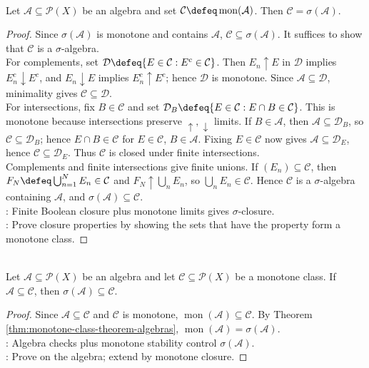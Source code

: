 \begin{theorem} \label{thm:monotone-class-theorem-algebras} \\
Let $\mathcal{A}\subseteq\mathcal{P}(X)$ be an algebra and set $\mathcal{C}\defeq\operatorname{mon}(\mathcal{A})$. Then $\mathcal{C}=\sigma(\mathcal{A})$.
\begin{proof} Since $\sigma(\mathcal{A})$ is monotone and contains $\mathcal{A}$, $\mathcal{C}\subseteq\sigma(\mathcal{A})$. It suffices to show that $\mathcal{C}$ is a $\sigma$-algebra.\\
For complements, set $\mathcal{D}\defeq\{E\in\mathcal{C}:E^c\in\mathcal{C}\}$. Then $E_n\uparrow E$ in $\mathcal{D}$ implies $E_n^c\downarrow E^c$, and $E_n\downarrow E$ implies $E_n^c\uparrow E^c$; hence $\mathcal{D}$ is monotone. Since $\mathcal{A}\subseteq\mathcal{D}$, minimality gives $\mathcal{C}\subseteq\mathcal{D}$.\\
For intersections, fix $B\in\mathcal{C}$ and set $\mathcal{D}_B\defeq\{E\in\mathcal{C}:E\cap B\in\mathcal{C}\}$. This is monotone because intersections preserve $\uparrow,\downarrow$ limits. If $B\in\mathcal{A}$, then $\mathcal{A}\subseteq\mathcal{D}_B$, so $\mathcal{C}\subseteq\mathcal{D}_B$; hence $E\cap B\in\mathcal{C}$ for $E\in\mathcal{C}$, $B\in\mathcal{A}$. Fixing $E\in\mathcal{C}$ now gives $\mathcal{A}\subseteq\mathcal{D}_E$, hence $\mathcal{C}\subseteq\mathcal{D}_E$. Thus $\mathcal{C}$ is closed under finite intersections.\\
Complements and finite intersections give finite unions. If $(E_n)\subseteq\mathcal{C}$, then $F_N\defeq\bigcup_{n=1}^{N}E_n\in\mathcal{C}$ and $F_N\uparrow\bigcup_nE_n$, so $\bigcup_nE_n\in\mathcal{C}$. Hence $\mathcal{C}$ is a $\sigma$-algebra containing $\mathcal{A}$, and $\sigma(\mathcal{A})\subseteq\mathcal{C}$.\\
: Finite Boolean closure plus monotone limits gives $\sigma$-closure.\\
: Prove closure properties by showing the sets that have the property form a monotone class.
\end{proof}
\end{theorem}

\begin{corollary} \label{cor:monotone-class-algebra-test} \\
Let $\mathcal{A}\subseteq\mathcal{P}(X)$ be an algebra and let $\mathcal{C}\subseteq\mathcal{P}(X)$ be a monotone class. If $\mathcal{A}\subseteq\mathcal{C}$, then $\sigma(\mathcal{A})\subseteq\mathcal{C}$.
\begin{proof} Since $\mathcal{A}\subseteq\mathcal{C}$ and $\mathcal{C}$ is monotone, $\operatorname{mon}(\mathcal{A})\subseteq\mathcal{C}$. By Theorem \ref{thm:monotone-class-theorem-algebras}, $\operatorname{mon}(\mathcal{A})=\sigma(\mathcal{A})$.\\
: Algebra checks plus monotone stability control $\sigma(\mathcal{A})$.\\
: Prove on the algebra; extend by monotone closure.
\end{proof}
\end{corollary}
